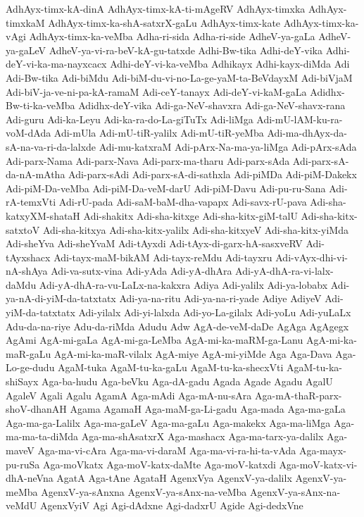 {AdhAyx-timx-kA-dinA
AdhAyx-timx-kA-ti-mAgeRV
AdhAyx-timxka
AdhAyx-timxkaM
AdhAyx-timx-ka-shA-satxrX-gaLu
AdhAyx-timx-kate
AdhAyx-timx-ka-vAgi
AdhAyx-timx-ka-veMba
Adha-ri-sida
Adha-ri-side
AdheV-ya-gaLa
AdheV-ya-gaLeV
AdheV-ya-vi-ra-beV-kA-gu-tatxde
Adhi-Bw-tika
Adhi-deY-vika
Adhi-deY-vi-ka-ma-nayxcacx
Adhi-deY-vi-ka-veMba
Adhikayx
Adhi-kayx-diMda
Adi
Adi-Bw-tika
Adi-biMdu
Adi-biM-du-vi-no-La-ge-yaM-ta-BeVdayxM
Adi-biVjaM
Adi-biV-ja-ve-ni-pa-kA-ramaM
Adi-ceY-tanayx
Adi-deY-vi-kaM-gaLa
Adidhx-Bw-ti-ka-veMba
Adidhx-deY-vika
Adi-ga-NeV-shavxra
Adi-ga-NeV-shavx-rana
Adi-guru
Adi-ka-Leyu
Adi-ka-ra-do-La-giTuTx
Adi-liMga
Adi-mU-lAM-ku-ra-voM-dAda
Adi-mUla
Adi-mU-tiR-yalilx
Adi-mU-tiR-yeMba
Adi-ma-dhAyx-da-sA-na-va-ri-da-lalxde
Adi-mu-katxraM
Adi-pArx-Na-ma-ya-liMga
Adi-pArx-sAda
Adi-parx-Nama
Adi-parx-Nava
Adi-parx-ma-tharu
Adi-parx-sAda
Adi-parx-sA-da-nA-mAtha
Adi-parx-sAdi
Adi-parx-sA-di-sathxla
Adi-piMDa
Adi-piM-Dakekx
Adi-piM-Da-veMba
Adi-piM-Da-veM-darU
Adi-piM-Davu
Adi-pu-ru-Sana
Adi-rA-temxVti
Adi-rU-pada
Adi-saM-baM-dha-vapapx
Adi-savx-rU-pava
Adi-sha-katxyXM-shataH
Adi-shakitx
Adi-sha-kitxge
Adi-sha-kitx-giM-talU
Adi-sha-kitx-satxtoV
Adi-sha-kitxya
Adi-sha-kitx-yalilx
Adi-sha-kitxyeV
Adi-sha-kitx-yiMda
Adi-sheYva
Adi-sheYvaM
Adi-tAyxdi
Adi-tAyx-di-garx-hA-sasxveRV
Adi-tAyxshacx
Adi-tayx-maM-bikAM
Adi-tayx-reMdu
Adi-tayxru
Adi-vAyx-dhi-vi-nA-shAya
Adi-va-sutx-vina
Adi-yAda
Adi-yA-dhAra
Adi-yA-dhA-ra-vi-lalx-daMdu
Adi-yA-dhA-ra-vu-LaLx-na-kakxra
Adiya
Adi-yalilx
Adi-ya-lobabx
Adi-ya-nA-di-yiM-da-tatxtatx
Adi-ya-na-ritu
Adi-ya-na-ri-yade
Adiye
AdiyeV
Adi-yiM-da-tatxtatx
Adi-yilalx
Adi-yi-lalxda
Adi-yo-La-gilalx
Adi-yoLu
Adi-yuLaLx
Adu-da-na-riye
Adu-da-riMda
Adudu
Adw
AgA-de-veM-daDe
AgAga
AgAgegx
AgAmi
AgA-mi-gaLa
AgA-mi-ga-LeMba
AgA-mi-ka-maRM-ga-Lanu
AgA-mi-ka-maR-gaLu
AgA-mi-ka-maR-vilalx
AgA-miye
AgA-mi-yiMde
Aga
Aga-Dava
Aga-Lo-ge-dudu
AgaM-tuka
AgaM-tu-ka-gaLu
AgaM-tu-ka-shecxVti
AgaM-tu-ka-shiSayx
Aga-ba-hudu
Aga-beVku
Aga-dA-gadu
Agada
Agade
Agadu
AgalU
AgaleV
Agali
Agalu
AgamA
Aga-mAdi
Aga-mA-nu-sAra
Aga-mA-thaR-parx-shoV-dhanAH
Agama
AgamaH
Aga-maM-ga-Li-gadu
Aga-mada
Aga-ma-gaLa
Aga-ma-ga-Lalilx
Aga-ma-gaLeV
Aga-ma-gaLu
Aga-makekx
Aga-ma-liMga
Aga-ma-ma-ta-diMda
Aga-ma-shAsatxrX
Aga-mashacx
Aga-ma-tarx-ya-dalilx
Aga-maveV
Aga-ma-vi-cAra
Aga-ma-vi-daraM
Aga-ma-vi-ra-hi-ta-vAda
Aga-mayx-pu-ruSa
Aga-moVkatx
Aga-moV-katx-daMte
Aga-moV-katxdi
Aga-moV-katx-vi-dhA-neVna
AgatA
Aga-tAne
AgataH
AgenxVya
AgenxV-ya-dalilx
AgenxV-ya-meMba
AgenxV-ya-sAnxna
AgenxV-ya-sAnx-na-veMba
AgenxV-ya-sAnx-na-veMdU
AgenxVyiV
Agi
Agi-dAdxne
Agi-dadxrU
Agide
Agi-dedxVne
}
